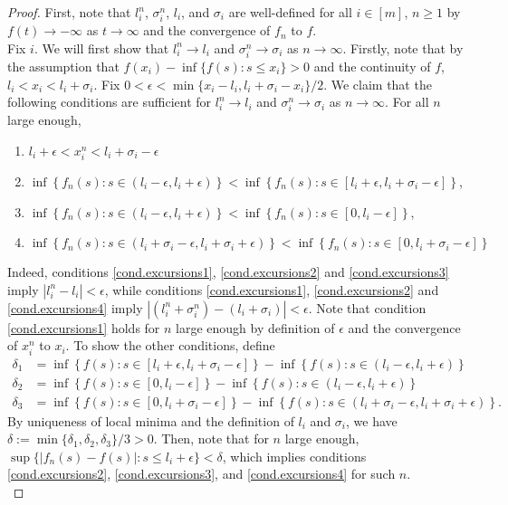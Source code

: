 \begin{proof}
First, note that $l_i^n$, $\sigma_i^n$, $l_i$, and $\sigma_i$ are well-defined for all $i\in [m]$, $n\geq 1$ by $f(t)\to -\infty$ as $t\to \infty$ and the convergence of $f_n$ to $f$. \\
Fix $i$. We will first show that $l^n_i\to l_i$ and $\sigma_i^n\to \sigma_i$ as $n\to \infty$. Firstly, note that by the assumption that $f(x_i)-\inf\{f(s):s\leq x_i\}>0$ and the continuity of $f$, $l_i<x_i<l_i+\sigma_i$. Fix $0<\epsilon<\min\{x_i-l_i,l_i+\sigma_i-x_i\}/2$. We claim that the following conditions are sufficient for $l^n_i\to l_i$ and $\sigma_i^n\to \sigma_i$ as $n\to \infty$. For all $n$ large enough,
\begin{enumerate}
    \item \label{cond.excursions1} $l_i+\epsilon<x^n_i<l_i+\sigma_i-\epsilon$
    \item \label{cond.excursions2}$\inf\left\{f_n(s):s\in (l_i-\epsilon, l_i+\epsilon)\right\}<\inf\left\{f_n(s):s\in [l_i+\epsilon,l_i+\sigma_i-\epsilon] \right\}$, 
    \item \label{cond.excursions3}$\inf\left\{f_n(s):s\in (l_i-\epsilon, l_i+\epsilon)\right\}<\inf\left\{f_n(s):s\in [0,l_i-\epsilon]\right\}$,
    \item \label{cond.excursions4} $\inf\left\{ f_n(s):s\in (l_i+\sigma_i-\epsilon,l_i+\sigma_i+\epsilon)\right\}<\inf\left\{f_n(s):s\in [0,l_i+\sigma_i-\epsilon]\right\}$
\end{enumerate}
Indeed, conditions \ref{cond.excursions1}, \ref{cond.excursions2} and \ref{cond.excursions3} imply $|l^n_i-l_i|<\epsilon$, while conditions \ref{cond.excursions1}, \ref{cond.excursions2} and \ref{cond.excursions4} imply $|(l^n_i+\sigma^n_i)-(l_i+\sigma_i)|<\epsilon$. Note that condition \ref{cond.excursions1} holds for $n$ large enough by definition of $\epsilon$ and the convergence of $x_i^n$ to $x_i$. To show the other conditions, define
\begin{align*}\delta_1&=\inf\left\{f(s):s\in [l_i+\epsilon,l_i+\sigma_i-\epsilon]\right\}-\inf\left\{f(s):s\in (l_i-\epsilon,l_i+\epsilon)\right\}\\
\delta_2&=\inf\left\{f(s):s\in [0,l_i-\epsilon]\right\}-\inf\left\{f(s):s\in (l_i-\epsilon,l_i+\epsilon)\right\}\\
\delta_3&=\inf\left\{f(s):s\in [0,l_i+\sigma_i-\epsilon]\right\}-\inf\left\{f(s):s\in (l_i+\sigma_i-\epsilon,l_i+\sigma_i+\epsilon)\right\}.
\end{align*}
By uniqueness of local minima and the definition of $l_i$ and $\sigma_i$, we have $\delta:=\min\{\delta_1,\delta_2,\delta_3\}/3>0$. Then, note that for $n$ large enough, $\sup\{|f_n(s)-f(s)|:s\leq l_i+\epsilon\}<\delta$, which implies conditions \ref{cond.excursions2}, \ref{cond.excursions3}, and \ref{cond.excursions4} for such $n$. \\

\end{proof}
